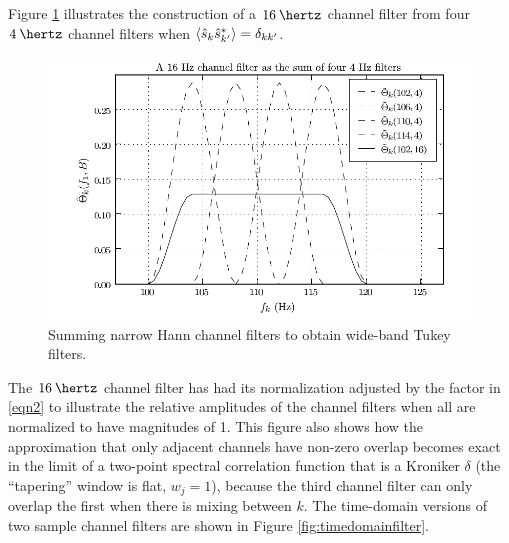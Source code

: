 \documentclass[10pt]{article}
\begin{document}
Figure \ref{fig:freqdomainfilter} illustrates the construction of a
\(\unit{16}{\hertz}\) channel filter from four \(\unit{4}{\hertz}\) channel
filters when \(\left\langle\hat{s}_{k} \hat{s}^{*}_{k'}\right\rangle = \delta_{k k'}\).
\begin{figure}
\begin{center}
\includegraphics{figures/freqdomainfilter.pdf}
\end{center}
\caption{Summing narrow Hann channel filters to obtain wide-band Tukey
filters.}
\label{fig:freqdomainfilter}
\end{figure}
The \(\unit{16}{\hertz}\) channel filter has had its normalization adjusted
by the factor in \eqref{eqn2} to illustrate the relative amplitudes of the
channel filters when all are normalized to have magnitudes of 1.  This
figure also shows how the approximation that only adjacent channels have
non-zero overlap becomes exact in the limit of a two-point spectral
correlation function that is a Kroniker \(\delta\) (the ``tapering'' window
is flat, \(w_{j} = 1\)), because the third channel filter can only overlap
the first when there is mixing between \(k\).  The time-domain versions of
two sample channel filters are shown in Figure \ref{fig:timedomainfilter}.
\end{document}
